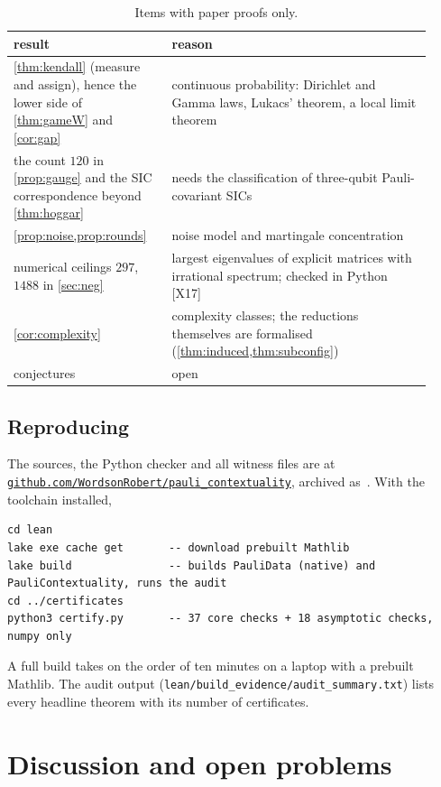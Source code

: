 \documentclass[a4paper,onecolumn,11pt,unpublished,nopdfoutputerror]{quantumarticle}
\theoremstyle{definition}
\newcommand{\cert}[1]{\textcolor{certblue}{\textsf{[#1]}}}
\newcommand{\repourl}{https://github.com/WordsonRobert/pauli_contextuality}
\newcommand{\repo}{\href{\repourl}{\nolinkurl{github.com/WordsonRobert/pauli_contextuality}}}
\begin{document}
\begin{table}[H]
\centering\small
\renewcommand{\arraystretch}{1.1}
\begin{tabular}{@{}p{0.34\linewidth}p{0.58\linewidth}@{}}
\toprule
result & reason\\\midrule
\cref{thm:kendall} (measure and assign), hence the lower side of \cref{thm:gameW} and \cref{cor:gap} &
continuous probability: Dirichlet and Gamma laws, Lukacs' theorem, a local limit theorem\\
the count $120$ in \cref{prop:gauge} and the SIC correspondence beyond \cref{thm:hoggar} & needs the classification of
three-qubit Pauli-covariant SICs\\
\cref{prop:noise,prop:rounds} & noise model and martingale concentration\\
numerical ceilings $297$, $1488$ in \cref{sec:neg} & largest eigenvalues of explicit matrices with irrational
spectrum; checked in Python \cert{X17}\\
\cref{cor:complexity} & complexity classes; the reductions themselves are formalised (\cref{thm:induced,thm:subconfig})\\
conjectures & open\\\bottomrule
\end{tabular}
\caption{Items with paper proofs only.}
\label{tab:notlean}
\end{table}

\subsection{Reproducing}

The sources, the Python checker and all witness files are at \repo, archived as~\cite{ZenodoArchive}. With the toolchain installed,
\begin{lstlisting}
cd lean
lake exe cache get       -- download prebuilt Mathlib
lake build               -- builds PauliData (native) and PauliContextuality, runs the audit
cd ../certificates
python3 certify.py       -- 37 core checks + 18 asymptotic checks, numpy only
\end{lstlisting}
A full build takes on the order of ten minutes on a laptop with a prebuilt Mathlib. The audit output
(\texttt{lean/build\_evidence/audit\_summary.txt}) lists every headline theorem with its number of certificates.

\section{Discussion and open problems}\label{sec:discussion}
\end{document}
